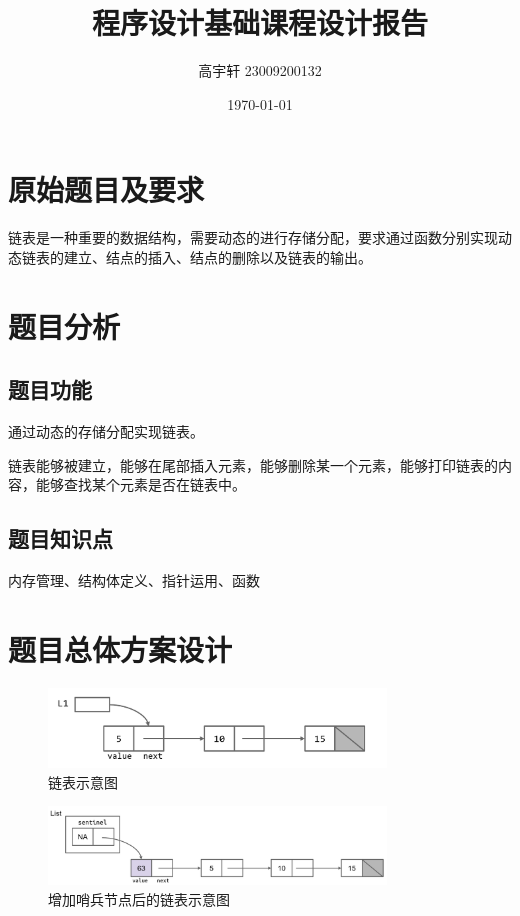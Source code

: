 \documentclass{ctexart}
\title{\vspace{-2cm}\textbf{程序设计基础课程设计报告} \\ \fontsize{12}{14}{---动态链表}}
\author{高宇轩 23009200132}
\date{\today}
\begin{document}
    
    \maketitle
    
    \section{原始题目及要求}
    链表是一种重要的数据结构，需要动态的进行存储分配，要求通过函数分别实现动态链表的建立、结点的插入、结点的删除以及链表的输出。
    
    \section{题目分析}
    
    \subsection{题目功能}
    通过动态的存储分配实现链表。
    
    链表能够被建立，能够在尾部插入元素，能够删除某一个元素，能够打印链表的内容，能够查找某个元素是否在链表中。
    \subsection{题目知识点}
    内存管理、结构体定义、指针运用、函数
    
    \section{题目总体方案设计}
    
    \begin{figure}[h] %
       \centering
       \includegraphics[width=0.8\textwidth]{LinkedList.png}
       \caption{链表示意图}   
    \end{figure}
    
    
    \begin{figure}[h] %
        \centering
        \includegraphics[width=0.8\textwidth]{sentinel.png}
        \caption{增加哨兵节点后的链表示意图}   
    \end{figure}
\end{document}
